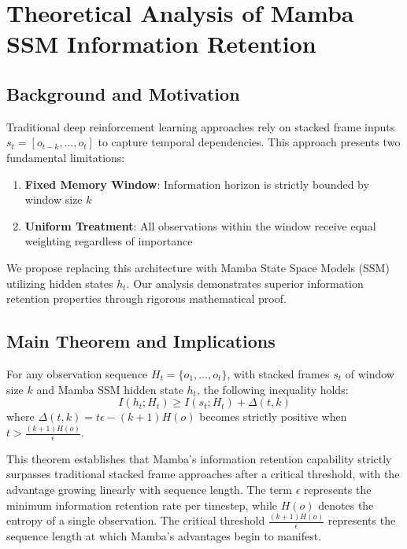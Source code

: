 \section{Theoretical Analysis of Mamba SSM Information Retention}

\subsection{Background and Motivation}
Traditional deep reinforcement learning approaches rely on stacked frame inputs $s_t = [o_{t-k}, \ldots, o_t]$ to capture temporal dependencies. This approach presents two fundamental limitations:

\begin{enumerate}
    \item \textbf{Fixed Memory Window}: Information horizon is strictly bounded by window size $k$
    \item \textbf{Uniform Treatment}: All observations within the window receive equal weighting regardless of importance
\end{enumerate}

We propose replacing this architecture with Mamba State Space Models (SSM) utilizing hidden states $h_t$. Our analysis demonstrates superior information retention properties through rigorous mathematical proof.

\subsection{Main Theorem and Implications}

\begin{theorem}
\label{the:information_retention_superiority}
For any observation sequence $H_t = \{o_1, \ldots, o_t\}$, with stacked frames $s_t$ of window size $k$ and Mamba SSM hidden state $h_t$, the following inequality holds:
\begin{equation}
    I(h_t; H_t) \geq I(s_t; H_t) + \Delta(t, k)
\end{equation}
where $\Delta(t, k) = t\epsilon - (k + 1)H(o)$ becomes strictly positive when $t > \frac{(k+1)H(o)}{\epsilon}$.

This theorem establishes that Mamba's information retention capability strictly surpasses traditional stacked frame approaches after a critical threshold, with the advantage growing linearly with sequence length. The term $\epsilon$ represents the minimum information retention rate per timestep, while $H(o)$ denotes the entropy of a single observation. The critical threshold $\frac{(k+1)H(o)}{\epsilon}$ represents the sequence length at which Mamba's advantages begin to manifest.
\end{theorem}

